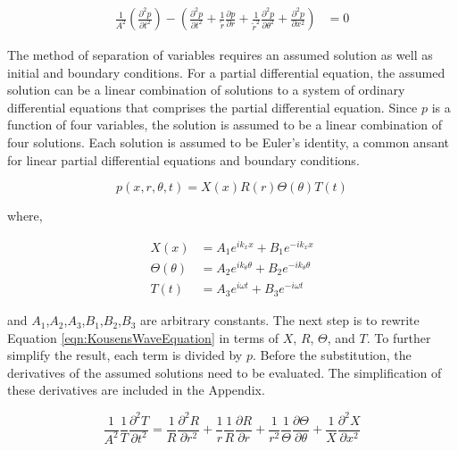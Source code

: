 \begin{align*} 
    \frac{1}{A^2}\left(
        \frac{\partial^2 {p}}{\partial t^2}
    \right) - 
        \left(
            \frac{\partial^2 {p}}{\partial t^2} + 
            \frac{1}{\tilde{r}}\frac{\partial p}{\partial r} +
            \frac{1}{\tilde{r}^2} \frac{\partial^2 p}{\partial \theta^2} + 
            \frac{\partial^2 p}{\partial x^2} 
        \right) &= 0  
\end{align*} 

The method of separation of variables requires an assumed solution as well as initial and boundary 
conditions. For a partial differential equation, the assumed solution can be a 
linear combination of solutions to a system of ordinary differential equations that
comprises the partial differential equation. Since $p$ is a function of four
variables, the solution is assumed to be a linear combination of four solutions.
Each solution is assumed to be Euler's identity, a common ansant for linear partial 
differential equations and boundary conditions.

\begin{equation}
    p(x,r,\theta,t) = X(x) R(r) \Theta(\theta) T(t)
\end{equation}

where, 

\begin{align*}
    X(x) &=
    A_1 e^{ik_x x} +
    B_1 e^{-ik_x x }\\
    \Theta(\theta) &=
    A_2 e^{i k_{\theta} \theta } +
    B_2 e^{-ik_{\theta} \theta }\\
    T(t) &=
    A_3 e^{i \omega t } +
    B_3 e^{-i\omega t  }
\end{align*}

and $A_1$,$A_2$,$A_3$,$B_1$,$B_2$,$B_3$ are arbitrary constants.  The next step 
is to rewrite Equation \ref{eqn:KousensWaveEquation} in terms of $X$, $R$, $\Theta$,
and $T$. To further simplify the result, each term is divided by $p$.
Before the substitution, the derivatives of the assumed solutions need to be
evaluated. The simplification of these derivatives are included in the Appendix.



\begin{equation}
    \frac{1}{A^2} \frac{1}{T}\frac{\partial^2 T}{\partial t^2} = 
    \frac{1}{R}\frac{\partial^2 R}{\partial r^2 } +
    \frac{1}{r}\frac{1}{R}\frac{\partial R}{\partial r}  + 
    \frac{1}{r^2}\frac{1}{\Theta}\frac{\partial \Theta}{\partial \theta} + 
    \frac{1}{X}\frac{\partial^2 X}{\partial x^2}
    \label{eqn:waveode}
\end{equation}

